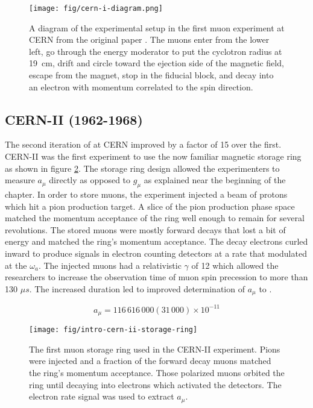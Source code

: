 \begin{figure}
\centering
\texttt{[image: fig/cern-i-diagram.png]}
\caption{A diagram of the experimental setup in the first muon \gmtwo experiment at CERN from the original paper \cite{cern-i}. The muons enter from the lower left, go through the energy moderator to put the cyclotron radius at \SI{19}{\cm}, drift and circle toward the ejection side of the magnetic field, escape from the magnet, stop in the fiducial block, and decay into an electron with momentum correlated to the spin direction. \label{fig:cern-i-diagram}}
\end{figure}

\subsection{CERN-II (1962-1968)}
The second iteration of \mugmtwo at CERN improved by a factor of 15 over the first.  CERN-II was the first \mugmtwo experiment to use the now familiar magnetic storage ring as shown in figure \ref{fig:intro-cern-ii-storage-ring}.  The storage ring design allowed the experimenters to measure $a_\mu$ directly as opposed to $g_\mu$ as explained near the beginning of the chapter. In order to store muons, the experiment injected a beam of protons which hit a pion production target.  A slice of the pion production phase space matched the momentum acceptance of the ring well enough to remain for several revolutions. The stored muons were mostly forward decays that lost a bit of energy and matched the ring's momentum acceptance.  The decay electrons curled inward to produce signals in electron counting detectors at a rate that modulated at the $\omega_a$.  The injected muons had a relativistic $\gamma$ of 12 which allowed the researchers to increase the observation time of muon spin precession to more than 130 $\mu s$.  The increased duration led to improved determination of $a_\mu$ to  \cite{47y-muon-g-2}.

\begin{equation}
\label{eqn:cern-ii-results}
a_\mu = 116\,616\,000 (31\,000) \times 10^{-11}
\end{equation}

\begin{figure}
\centering
\texttt{[image: fig/intro-cern-ii-storage-ring]}
\caption{
    The first muon storage ring used in the CERN-II experiment.  Pions were injected and a fraction of the forward decay muons matched the ring's momentum acceptance.  Those polarized muons orbited the ring until decaying into electrons which activated the detectors.  The electron rate signal was used to extract $a_\mu$.
    \label{fig:intro-cern-ii-storage-ring}    
}
\end{figure}

